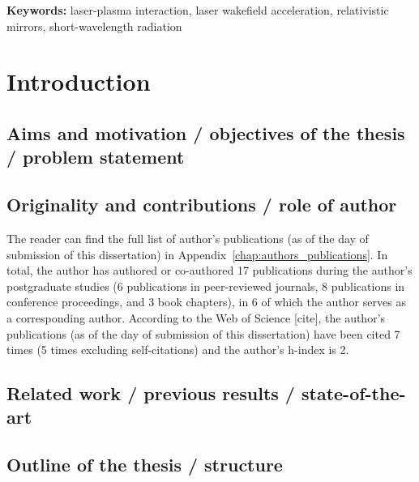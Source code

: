\documentclass[10pt, twoside, a4paper, openright]{report}
\newcommand{\keywords}{}
\begin{document}
{\noindent \bf Keywords:} laser-plasma interaction, laser wakefield acceleration, relativistic mirrors, short-wavelength radiation \keywords

\newpage
\thispagestyle{empty}
\mbox{}


\tableofcontents
{}
\thispagestyle{empty}


\chapter{Introduction}
%

\section{Aims and motivation / objectives of the thesis / problem statement}
%

\section{Originality and contributions / role of author}
%

The reader can find the full list of author's publications (as of the day of submission of this dissertation) in Appendix~\ref{chap:authors_publications}. In total, the author has authored or co-authored 17 publications during the author's postgraduate studies (6 publications in peer-reviewed journals, 8 publications in conference proceedings, and 3 book chapters), in 6 of which the author serves as a corresponding author. According to the Web of Science [cite], the author's publications (as of the day of submission of this dissertation) have been cited 7 times (5 times excluding self-citations) and the author's h-index is 2.

\section{Related work / previous results / state-of-the-art}
%

\section{Outline of the thesis / structure}
%
\end{document}
